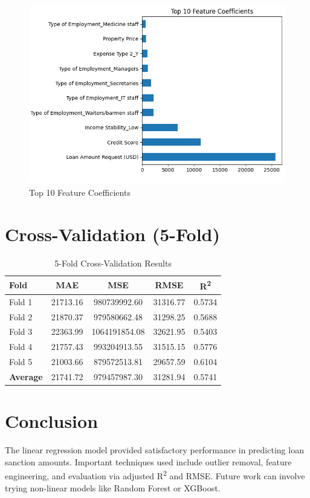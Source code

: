 \documentclass[12pt]{article}
\begin{document}
\begin{figure}[H]
\centering
\includegraphics[width=0.65\linewidth]{images/top_features.png}
\caption{Top 10 Feature Coefficients}
\end{figure}

\section{Cross-Validation (5-Fold)}

\begin{table}[H]
\centering
\begin{tabular}{lcccc}
\toprule
\textbf{Fold} & \textbf{MAE} & \textbf{MSE} & \textbf{RMSE} & \textbf{R\textsuperscript{2}} \\
\midrule
Fold 1 & 21713.16 & 980739992.60 & 31316.77 & 0.5734 \\
Fold 2 & 21870.37 & 979580662.48 & 31298.25 & 0.5688 \\
Fold 3 & 22363.99 & 1064191854.08 & 32621.95 & 0.5403 \\
Fold 4 & 21757.43 & 993204913.55 & 31515.15 & 0.5776 \\
Fold 5 & 21003.66 & 879572513.81 & 29657.59 & 0.6104 \\
\midrule
\textbf{Average} & 21741.72 & 979457987.30 & 31281.94 & 0.5741 \\
\bottomrule
\end{tabular}
\caption{5-Fold Cross-Validation Results}
\end{table}

\section{Conclusion}
The linear regression model provided satisfactory performance in predicting loan sanction amounts. Important techniques used include outlier removal, feature engineering, and evaluation via adjusted R\textsuperscript{2} and RMSE. Future work can involve trying non-linear models like Random Forest or XGBoost.
\end{document}

